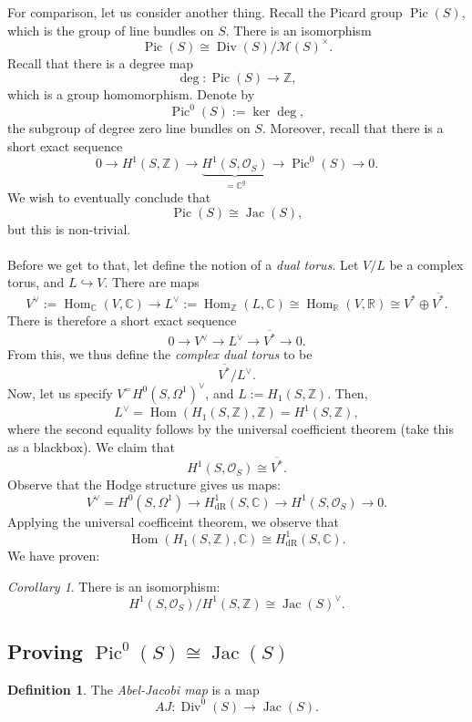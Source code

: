 \documentclass[a4paper]{report}
\theoremstyle{definition}
\newtheorem{definition}{Definition}
\theoremstyle{remark}
\theoremstyle{proposition}
\theoremstyle{conjecture}
\theoremstyle{lemma}
\theoremstyle{corollary}
\newtheorem{corollary}{Corollary}
\theoremstyle{exercise}
\theoremstyle{example}
\newcommand{\C}{\mathbb{C}}
\newcommand{\mcal}{\mathcal}
\newcommand{\on}{\operatorname}
\begin{document}
For comparison, let us consider another thing. Recall the Picard group 
$\on{Pic}(S)$, which is the group of line bundles on $S$.
There is an isomorphism 
$$\on{Pic}(S) \cong \on{Div}(S)/\mcal{M}(S)^\times.$$
Recall that there is a degree map
$$\deg : \on{Pic}(S) \longrightarrow \mathbb{Z},$$
which is a group homomorphism. Denote by 
$$\on{Pic}^0(S) := \ker \deg,$$
the subgroup of degree zero line bundles on $S$.
Moreover, recall that there is a short exact sequence 
$$0\longrightarrow H^1(S,\mathbb{Z}) \longrightarrow \underbrace{H^1(S,\mcal{O}_S)}_{=\C^g} \longrightarrow \on{Pic}^0(S)\longrightarrow 0.$$
We wish to eventually conclude that 
$$\on{Pic}(S) \cong \on{Jac}(S),$$
but this is non-trivial.\\\\
Before we get to that, let define the notion of a \emph{dual torus}. 
Let $V/L$ be a complex torus, and $L\hookrightarrow V$. 
There are maps
$$V^\vee := \on{Hom}_\C(V,\C) \longrightarrow L^\vee :=\on{Hom}_{\mathbb{Z}}(L,\C) \cong \on{Hom}_{\mathbb{R}}(V,\mathbb{R}) \cong V^\ast \oplus \overline{V^\ast}.$$
There is therefore a short exact sequence 
$$0\longrightarrow V^\vee \longrightarrow L^\vee \longrightarrow \overline{V^\ast} \longrightarrow 0.$$
From this, we thus define the \emph{complex dual torus} to be 
$$\overline{V^\ast}/L^\vee.$$
Now, let us specify $V^ = H^0(S,\Omega^1)^\vee$, and 
$L := H_1(S,\mathbb{Z})$. Then,
$$L^\vee = \on{Hom}(H_1(S,\mathbb{Z}),\mathbb{Z}) = H^1(S,\mathbb{Z}),$$
where the second equality follows by the universal coefficient theorem
(take this as a blackbox).
We claim that 
$$H^1(S,\mcal{O}_S) \cong \overline{V^\ast}.$$
Observe that the Hodge structure gives us maps: 
$$V^\vee = H^0(S,\Omega^1) \longrightarrow H^1_{\on{dR}}(S,\C)\longrightarrow H^1(S,\mcal{O}_S) \longrightarrow 0.$$
Applying the universal coefficeint theorem, 
we observe that 
$$\on{Hom}(H_1(S,\mathbb{Z}),\C) \cong H^1_{\on{dR}}(S,\C).$$
We have proven:
\begin{corollary}
    There is an isomorphism:
    $$H^1(S,\mcal{O}_S) / H^1(S,\mathbb{Z}) \cong \on{Jac}(S)^\vee.$$
\end{corollary}

\subsection{Proving $\on{Pic}^0(S) \cong \on{Jac}(S)$}

\begin{definition}
    The \emph{Abel-Jacobi map} is a map
    $$AJ : \on{Div}^0(S) \longrightarrow \on{Jac}(S).$$
\end{definition}
\end{document}
